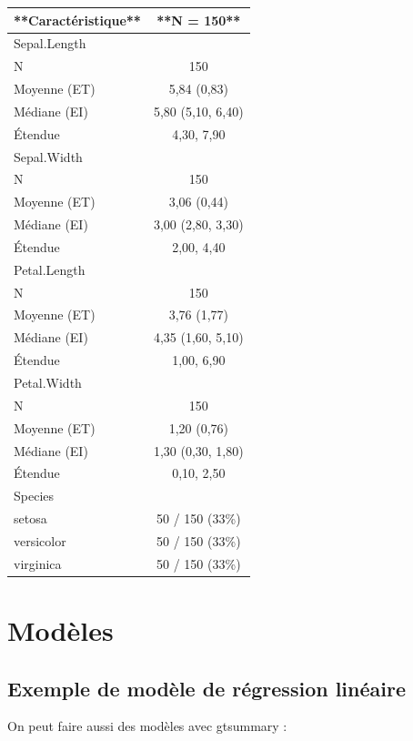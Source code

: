 \documentclass[
]{book}
\begin{document}
\begin{tabular}{l|c}
\hline
**Caractéristique** & **N = 150**\\
\hline
Sepal.Length & \\
\hline
N & 150\\
\hline
Moyenne (ET) & 5,84 (0,83)\\
\hline
Médiane (EI) & 5,80 (5,10, 6,40)\\
\hline
Étendue & 4,30, 7,90\\
\hline
Sepal.Width & \\
\hline
N & 150\\
\hline
Moyenne (ET) & 3,06 (0,44)\\
\hline
Médiane (EI) & 3,00 (2,80, 3,30)\\
\hline
Étendue & 2,00, 4,40\\
\hline
Petal.Length & \\
\hline
N & 150\\
\hline
Moyenne (ET) & 3,76 (1,77)\\
\hline
Médiane (EI) & 4,35 (1,60, 5,10)\\
\hline
Étendue & 1,00, 6,90\\
\hline
Petal.Width & \\
\hline
N & 150\\
\hline
Moyenne (ET) & 1,20 (0,76)\\
\hline
Médiane (EI) & 1,30 (0,30, 1,80)\\
\hline
Étendue & 0,10, 2,50\\
\hline
Species & \\
\hline
setosa & 50 / 150 (33\%)\\
\hline
versicolor & 50 / 150 (33\%)\\
\hline
virginica & 50 / 150 (33\%)\\
\hline
\end{tabular}

\hypertarget{moduxe8les}{%
\section{Modèles}\label{moduxe8les}}

\hypertarget{exemple-de-moduxe8le-de-ruxe9gression-linuxe9aire}{%
\subsection{Exemple de modèle de régression linéaire}\label{exemple-de-moduxe8le-de-ruxe9gression-linuxe9aire}}

On peut faire aussi des modèles avec gtsummary :
\end{document}

